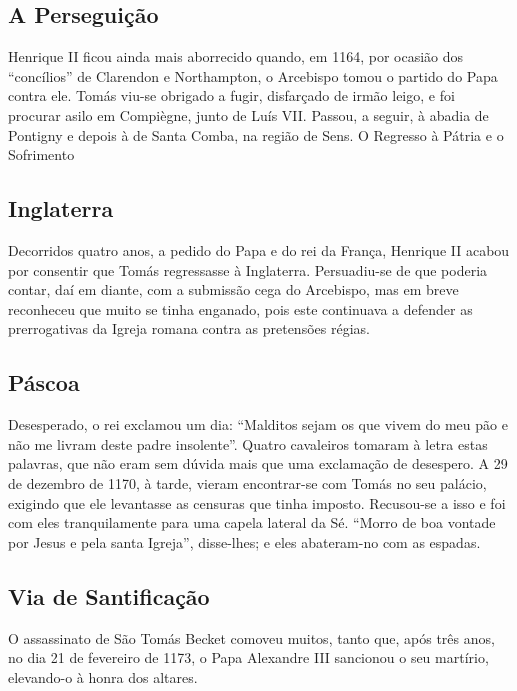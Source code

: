 \documentclass[15pt]{article}
\begin{document}
\begin{justify}
\subsection{A Perseguição}\label{sub:} %

Henrique II ficou ainda mais aborrecido quando, em 1164, por ocasião dos “concílios” de Clarendon e Northampton, o Arcebispo tomou o partido do Papa contra ele. Tomás viu-se obrigado a fugir, disfarçado de irmão leigo, e foi procurar asilo em Compiègne, junto de Luís VII. Passou, a seguir, à abadia de Pontigny e depois à de Santa Comba, na região de Sens.
O Regresso à Pátria e o Sofrimento

\subsection{Inglaterra}\label{sub:} %

Decorridos quatro anos, a pedido do Papa e do rei da França, Henrique II acabou por consentir que Tomás regressasse à Inglaterra. Persuadiu-se de que poderia contar, daí em diante, com a submissão cega do Arcebispo, mas em breve reconheceu que muito se tinha enganado, pois este continuava a defender as prerrogativas da Igreja romana contra as pretensões régias.

\subsection{Páscoa}\label{sub:} %

Desesperado, o rei exclamou um dia: “Malditos sejam os que vivem do meu pão e não me livram deste padre insolente”. Quatro cavaleiros tomaram à letra estas palavras, que não eram sem dúvida mais que uma exclamação de desespero. A 29 de dezembro de 1170, à tarde, vieram encontrar-se com Tomás no seu palácio, exigindo que ele levantasse as censuras que tinha imposto. Recusou-se a isso e foi com eles tranquilamente para uma capela lateral da Sé. “Morro de boa vontade por Jesus e pela santa Igreja”, disse-lhes; e eles abateram-no com as espadas.

\subsection{Via de Santificação}\label{sub:} %

O assassinato de São Tomás Becket comoveu muitos, tanto que, após três anos, no dia 21 de fevereiro de 1173, o Papa Alexandre III sancionou o seu martírio, elevando-o à honra dos altares.

\end{justify}
\end{document}
